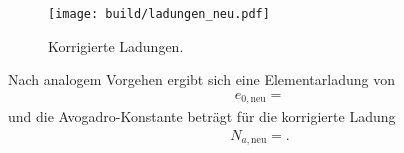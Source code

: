 \begin{figure}[H]
  \centering
  \texttt{[image: build/ladungen\_neu.pdf]}
  \caption{Korrigierte Ladungen.}
  \label{plot:2}
\end{figure}

Nach analogem Vorgehen ergibt sich eine Elementarladung von
\begin{align*}
  e_{0,\text{neu}} = 
\end{align*}
und die Avogadro-Konstante beträgt für die korrigierte Ladung
\begin{align*}
  N_{a,\text{neu}} = .
\end{align*}



%
%
%     
%
